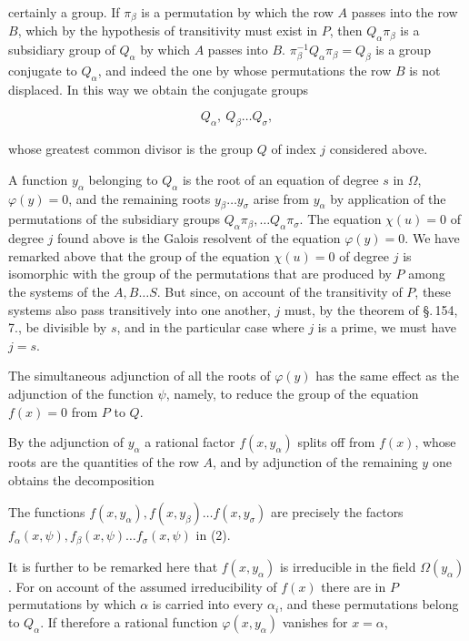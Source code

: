 
certainly a group. If $\pi_\beta$ is a permutation by which the
row $A$ passes into the row $B$, which by the hypothesis of
transitivity must exist in $P$, then
$Q_\alpha \pi_\beta$ is a subsidiary group of $Q_\alpha$ by which
$A$ passes into $B$. $\pi_\beta^{-1} Q_\alpha \pi_\beta =
Q_\beta$ is a group conjugate to $Q_\alpha$, and indeed the one
by whose permutations the row $B$ is not displaced.
In this way we obtain the conjugate groups

\[ Q_\alpha,\ Q_\beta \dots Q_\sigma, \]

whose greatest common divisor is the group $Q$ of index $j$
considered above.

A function $y_\alpha$ belonging to $Q_\alpha$ is the root
of an equation of degree $s$ in $\Omega$,
$\varphi(y) = 0$, and the remaining roots $y_\beta \dots y_\sigma$
arise from $y_\alpha$ by application of the permutations
of the subsidiary groups $Q_\alpha \pi_\beta, \dots Q_\alpha \pi_\sigma$.
The equation $\chi(u) = 0$ of degree $j$ found above is
the Galois resolvent of the equation $\varphi(y) = 0$. We
have remarked above that the group of the equation $\chi(u) = 0$
of degree $j$ is isomorphic with the group of the permutations
that are produced by $P$ among the systems of the $A, B \dots S$.
But since, on account of the transitivity of $P$,
these systems also pass transitively into one another, $j$
must, by the theorem of \S.\,154, 7., be divisible by $s$, and in the
particular case where $j$ is a prime, we must have $j = s$.

The simultaneous adjunction of all the roots of $\varphi(y)$
has the same effect as the adjunction of the function $\psi$,
namely, to reduce the group of the equation $f(x) = 0$ from $P$ to $Q$.

By the adjunction of $y_\alpha$ a rational factor
$f(x, y_\alpha)$ splits off from $f(x)$, whose roots are the
quantities of the row $A$, and by adjunction of the remaining $y$
one obtains the decomposition


The functions $f(x,y_\alpha), f(x,y_\beta) \dots f(x,y_\sigma)$
are precisely the factors $f_\alpha(x,\psi), f_\beta(x,\psi) \dots
f_\sigma(x,\psi)$ in (2).

It is further to be remarked here that $f(x,y_\alpha)$ is
irreducible in the field $\Omega(y_\alpha)$. For on account of the
assumed irreducibility of $f(x)$ there are in $P$
permutations by which $\alpha$ is carried into every $\alpha_i$,
and these permutations belong to
$Q_\alpha$. If therefore a rational function $\varphi(x,
y_\alpha)$ vanishes for $x = \alpha$,
